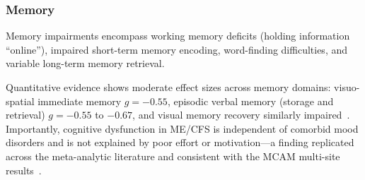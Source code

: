 \subsubsection{Memory}

Memory impairments encompass working memory deficits (holding information ``online''), impaired short-term memory encoding, word-finding difficulties, and variable long-term memory retrieval.

Quantitative evidence shows moderate effect sizes across memory domains: visuo-spatial immediate memory $g = -0.55$, episodic verbal memory (storage and retrieval) $g = -0.55$ to $-0.67$, and visual memory recovery similarly impaired~\cite{Sebaiti2022cognitive}. Importantly, cognitive dysfunction in ME/CFS is independent of comorbid mood disorders and is not explained by poor effort or motivation---a finding replicated across the meta-analytic literature and consistent with the MCAM multi-site results~\cite{Lange2024cognitive,Sebaiti2022cognitive}.

